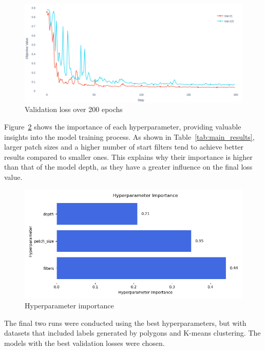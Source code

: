 \begin{figure}[H]
    \centering
    \includegraphics[width=0.75\linewidth]{PICTURES/loss.png}
    \caption{Validation loss over 200 epochs}
    \label{fig:validation_loss}
\end{figure}


Figure~\ref{fig:Hyperparameter} shows the importance of each hyperparameter, providing valuable insights into the model training process. As shown in Table~\ref{tab:main_results}, larger patch sizes and a higher number of start filters tend to achieve better results compared to smaller ones. This explains why their importance is higher than that of the model depth, as they have a greater influence on the final loss value.
\begin{figure}[H]
    \centering
    \includegraphics[width=0.75\linewidth]{PICTURES/hyperparam.png}
    \caption{Hyperparameter importance}
    \label{fig:Hyperparameter}
\end{figure}

The final two runs were conducted using the best hyperparameters, but with datasets that included labels generated by polygons and K-means clustering. The models with the best validation losses were chosen. 
    
%

